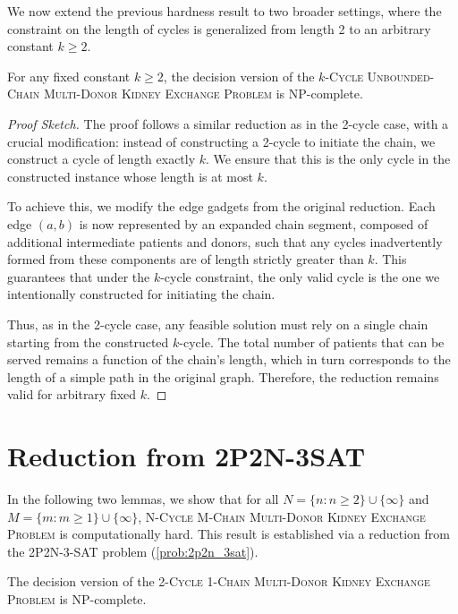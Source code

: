We now extend the previous hardness result to two broader settings, where the constraint on the length of cycles is generalized from length 2 to an arbitrary constant $k \ge 2$.

\begin{lemma}
For any fixed constant $k \ge 2$, the decision version of the \textsc{$k$-Cycle Unbounded-Chain Multi-Donor Kidney Exchange Problem} is NP-complete.
\end{lemma}

\begin{proof}[Proof Sketch]
The proof follows a similar reduction as in the 2-cycle case, with a crucial modification: instead of constructing a 2-cycle to initiate the chain, we construct a cycle of length exactly $k$. We ensure that this is the only cycle in the constructed instance whose length is at most $k$.

To achieve this, we modify the edge gadgets from the original reduction. Each edge $(a, b)$ is now represented by an expanded chain segment, composed of additional intermediate patients and donors, such that any cycles inadvertently formed from these components are of length strictly greater than $k$. This guarantees that under the $k$-cycle constraint, the only valid cycle is the one we intentionally constructed for initiating the chain.

Thus, as in the 2-cycle case, any feasible solution must rely on a single chain starting from the constructed $k$-cycle. The total number of patients that can be served remains a function of the chain's length, which in turn corresponds to the length of a simple path in the original graph. Therefore, the reduction remains valid for arbitrary fixed $k$.
\end{proof}



\section{Reduction from 2P2N-3SAT}

In the following two lemmas, we show that for all $N = \{n : n \ge 2\} \cup \{\infty\}$ and $M = \{m:m \ge 1\} \cup \{\infty\}$, \textsc{N-Cycle M-Chain Multi-Donor Kidney Exchange Problem} is computationally hard. This result is established via a reduction from the \textsc{2P2N-3-SAT} problem (\autoref{prob:2p2n_3sat}). 

\begin{lemma}
\label{lemma:2c1c_npc}
The decision version of the \textsc{2-Cycle 1-Chain Multi-Donor Kidney Exchange Problem} is NP-complete.
\end{lemma}

